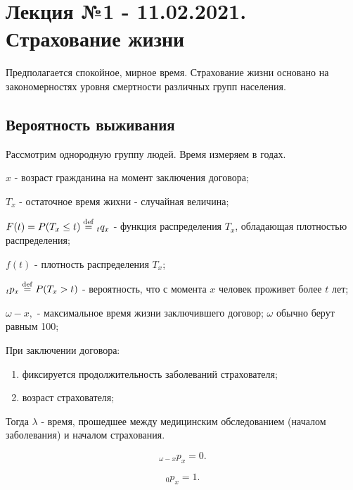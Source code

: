 \chapter{Лекция №1 - 11.02.2021. Страхование жизни}\label{lec:1}


\begin{remark}
	Предполагается спокойное, мирное время. Страхование жизни основано на закономерностях уровня смертности различных групп населения.
\end{remark}

\section{Вероятность выживания} %
\label{lec:1sec:alive_prob}

Рассмотрим однородную группу людей. Время измеряем в годах.

\begin{definition}
	
	$x$ - возраст гражданина на момент заключения договора;

	$T_x$ - остаточное время жихни - случайная величина;

	$F(t) = P(T_x \leq t) \mathrel{\stackrel{\rm def}=} {}_{t}q_x$ - функция распределения $T_x$, обладающая плотностью распределения;

	$f(t)$ - плотность распределения $T_x$;

	${}_{t}p_x \mathrel{\stackrel{\rm def}=} P(T_x > t)$ - вероятность, что с момента $x$ человек проживет более $t$ лет;

	$\omega - x, $ - максимальное время жизни заключившего договор; $\omega$ обычно берут равным 100;
\end{definition}

\begin{definition}
	При заключении договора:
	\begin{enumerate}
		\item фиксируется продолжительность заболеваний страхователя;
		\item возраст страхователя;
	\end{enumerate}

	Тогда $\lambda$ - время, прошедшее между медицинским обследованием (началом заболевания) и началом страхования.
\end{definition}
	


\begin{clair}

	$${}_{\omega - x}p_x = 0.$$

	$${}_{0}p_x = 1.$$

\end{clair}

